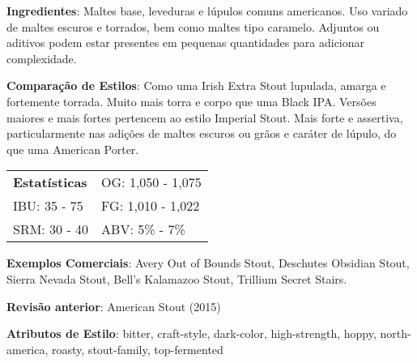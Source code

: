 \textbf{Ingredientes}: Maltes base, leveduras e lúpulos comuns americanos. Uso variado de maltes escuros e torrados, bem como maltes tipo caramelo. Adjuntos ou aditivos podem estar presentes em pequenas quantidades para adicionar complexidade.

\textbf{Comparação de Estilos}: Como uma Irish Extra Stout lupulada, amarga e fortemente torrada. Muito mais torra e corpo que uma Black IPA. Versões maiores e mais fortes pertencem ao estilo Imperial Stout. Mais forte e assertiva, particularmente nas adições de maltes escuros ou grãos e caráter de lúpulo, do que uma American Porter.

\begin{tabular}{@{}p{35mm}p{35mm}@{}}
  \textbf{Estatísticas} & OG: 1,050 - 1,075 \\
  IBU: 35 - 75  & FG: 1,010 - 1,022 \\
  SRM: 30 - 40  & ABV: 5\% - 7\%
\end{tabular}

\textbf{Exemplos Comerciais}: Avery Out of Bounds Stout, Deschutes Obsidian Stout, Sierra Nevada Stout, Bell’s Kalamazoo Stout, Trillium Secret Stairs.

\textbf{Revisão anterior}: American Stout (2015)

\textbf{Atributos de Estilo}: bitter, craft-style, dark-color, high-strength, hoppy, north-america, roasty, stout-family, top-fermented
